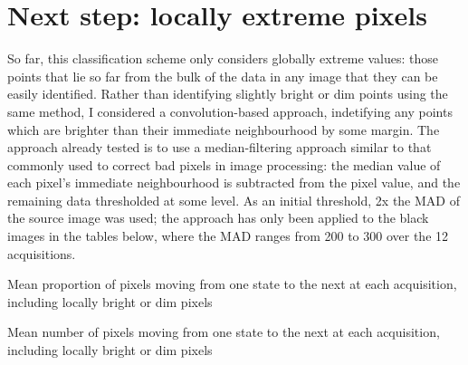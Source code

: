 \documentclass[10pt,fleqn]{article}
\begin{document}
\clearpage

\section{Next step: locally extreme pixels}

So far, this classification scheme only considers globally extreme values: those points that lie so far from the bulk of the data in any image that they can be easily identified. Rather than identifying slightly bright or dim points using the same method, I considered a convolution-based approach, indetifying any points which are brighter than their immediate neighbourhood by some margin. The approach already tested is to use a median-filtering approach similar to that commonly used to correct bad pixels in image processing: the median value of each pixel's immediate neighbourhood is subtracted from the pixel value, and the remaining data thresholded at some level. As an initial threshold, 2x the MAD of the source image was used; the approach has only been applied to the black images in the tables below, where the MAD ranges from 200 to 300 over the 12 acquisitions. 

\begin{table}[!ht]
\caption{Mean proportion of pixels moving from one state to the next at each acquisition, including locally bright or dim pixels}

\end{table}

\begin{table}[!ht]
\caption{Mean number of pixels moving from one state to the next at each acquisition, including locally bright or dim pixels}

\end{table}
\end{document}
